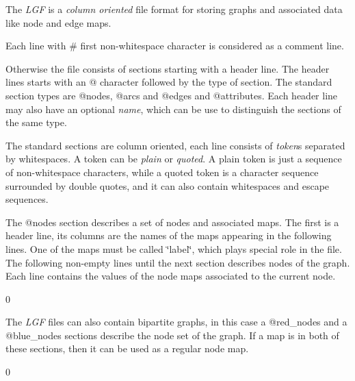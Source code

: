 The {\itshape LGF} is a {\itshape column oriented} file format for storing graphs and associated data like node and edge maps.

Each line with {\ttfamily \textquotesingle{}\#\textquotesingle{}} first non-\/whitespace character is considered as a comment line.

Otherwise the file consists of sections starting with a header line. The header lines starts with an {\ttfamily \textquotesingle{}@\textquotesingle{}} character followed by the type of section. The standard section types are {\ttfamily @nodes}, {\ttfamily @arcs} and {\ttfamily @edges} and @attributes. Each header line may also have an optional {\itshape name}, which can be use to distinguish the sections of the same type.

The standard sections are column oriented, each line consists of {\itshape token}s separated by whitespaces. A token can be {\itshape plain} or {\itshape quoted}. A plain token is just a sequence of non-\/whitespace characters, while a quoted token is a character sequence surrounded by double quotes, and it can also contain whitespaces and escape sequences.

The {\ttfamily @nodes} section describes a set of nodes and associated maps. The first is a header line, its columns are the names of the maps appearing in the following lines. One of the maps must be called {\ttfamily \char`\"{}label\char`\"{}}, which plays special role in the file. The following non-\/empty lines until the next section describes nodes of the graph. Each line contains the values of the node maps associated to the current node.


\begin{DoxyCode}{0}

\end{DoxyCode}


The {\itshape LGF} files can also contain bipartite graphs, in this case a {\ttfamily @red\+\_\+nodes} and a {\ttfamily @blue\+\_\+nodes} sections describe the node set of the graph. If a map is in both of these sections, then it can be used as a regular node map.


\begin{DoxyCode}{0}

\end{DoxyCode}



